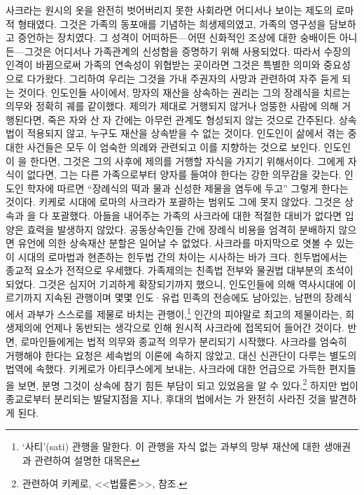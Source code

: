 사크라는 원시의 옷을 완전히 벗어버리지 못한 사회라면 어디서나 보이는
제도의 로마적 형태였다.
그것은 가족의 동포애를 기념하는 희생제의였고,
가족의 영구성을 담보하고 증언하는 장치였다.
그 성격이 어떠하든---어떤 신화적인 조상에 대한 숭배이든 아니든---그것은
어디서나 가족관계의 신성함을 증명하기 위해 사용되었다.
따라서 수장의 인격이 바뀜으로써 가족의 연속성이 위협받는 곳이라면
그것은 특별한 의미와 중요성으로 다가왔다.
그리하여 우리는 그것을 가내 주권자의 사망과 관련하여 자주 듣게 되는 것이다.
인도인들 사이에서, 망자의 재산을 상속하는 권리는 그의 장례식을 치르는 의무와
정확히 궤를 같이했다.
제의가 제대로 거행되지 않거나 엉뚱한 사람에 의해 거행된다면,
죽은 자와 산 자 간에는 아무런 관계도 형성되지 않는 것으로 간주된다.
상속법이 적용되지 않고, 누구도 재산을 상속받을 수 없는 것이다.
인도인이 삶에서 겪는 중대한 사건들은 모두 이 엄숙한 의례와 관련되고 이를
지향하는 것으로 보인다.
인도인이 을 한다면, 그것은
그의 사후에 제의를 거행할 자식을 가지기 위해서이다.
그에게 자식이 없다면,
그는 다른 가족으로부터 양자를 들여야 한다는 강한 의무감을 갖는다.
인도인 학자에 따르면 ``장례식의 떡과 물과 신성한 제물을 염두에 두고''
그렇게 한다는 것이다.
키케로 시대에 로마의 사크라가 포괄하는 범위도 그에 못지 않았다.
그것은 상속과 을 다 포괄했다.
아들을 내어주는 가족의 사크라에 대한 적절한 대비가 없다면
입양은 효력을 발생하지 않았다.
공동상속인들 간에 장례식 비용을 엄격히 분배하지 않으면
유언에 의한 상속재산 분할은 일어날 수 없었다.
사크라를 마지막으로 엿볼 수 있는
이 시대의 로마법과 현존하는 힌두법 간의 차이는
시사하는 바가 크다.
힌두법에서는 종교적 요소가 전적으로 우세했다.
가족제의는 친족법 전부와 물권법 대부분의 초석이 되었다.
그것은 심지어 기괴하게 확장되기까지 했으니,
인도인들에 의해 역사시대에 이르기까지 지속된 관행이며
몇몇 인도^^b7유럽 민족의 전승에도 남아있는,
남편의 장례식에서 과부가 스스로를 제물로 바치는 관행이,\footnote{%
  `사티'(sati) 관행을 말한다.
  이 관행을 자식 없는 과부의 망부 재산에 대한 생애권과 관련하여 설명한 대목은
  }
인간의 피야말로 최고의 제물이라는, 희생제의에 언제나 동반되는 생각으로 인해
원시적 사크라에 접목되어 들어간 것이다.
반면, 로마인들에게는 법적 의무와 종교적 의무가 분리되기 시작했다.
사크라를 엄숙히 거행해야 한다는 요청은 세속법의 이론에 속하지 않았고,
대신 신관단이 다루는
별도의 법역에 속했다.
키케로가 아티쿠스에게 보내는,
사크라에 대한 언급으로 가득한
편지들을 보면, 분명 그것이 상속에 참기 힘든 부담이 되고 있었음을
알 수 있다.\footnote{%
  관련하여 키케로, <<법률론>>,  참조. }
하지만 법이 종교로부터 분리되는 발달지점을 지나,
후대의 법에서는 가 완전히 사라진 것을 발견하게 된다.

